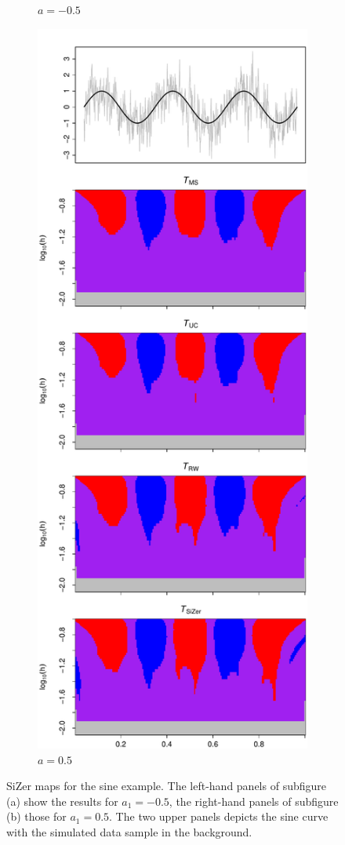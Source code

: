 \begin{figure}[p]
\begin{subfigure}[b]{0.475\textwidth}
\caption{$a=-0.5$}
\end{subfigure}
\hspace{0.25cm}
\begin{subfigure}[b]{0.475\textwidth}
\includegraphics[width=\textwidth]{Plots/SiZer_map_T_1000_sine_a1_50.pdf}
\caption{$a=0.5$}
\end{subfigure}
\caption{SiZer maps for the sine example. The left-hand panels of subfigure (a) show the results for $a_1=-0.5$, the right-hand panels of subfigure (b) those for $a_1=0.5$. The two upper panels depicts the sine curve with the simulated data sample in the background.}\label{fig:sizer:sine}
\end{figure}  



